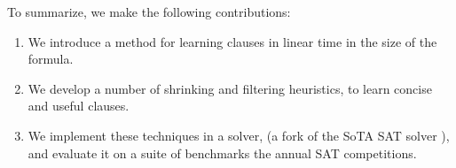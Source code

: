 
To summarize, we make the following contributions: 

\begin{enumerate} 
    \item We introduce a method for learning \pr clauses in linear time in the size of the formula. 
    \item We develop a number of shrinking and filtering heuristics, to learn concise and useful \pr clauses.%
    \item We implement these techniques in a solver, \tool (a fork of the SoTA SAT solver \cadical), and evaluate it on a suite of benchmarks the annual SAT competitions.
\end{enumerate}
